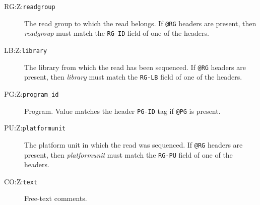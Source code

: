 \documentclass[10pt]{article}
\newcommand{\tagvalue}[1]{{\tt #1}}
\begin{document}
\begin{description}
\item[RG:Z:\tagvalue{readgroup}]
The read group to which the read belongs.
If {\tt @RG} headers are present, then \emph{readgroup} must match the
{\tt RG-ID} field of one of the headers.

\item[LB:Z:\tagvalue{library}]
The library from which the read has been sequenced.
If {\tt @RG} headers are present, then \emph{library} must match the
{\tt RG-LB} field of one of the headers.

\item[PG:Z:\tagvalue{program\_id}]
Program. Value matches the header {\tt PG-ID} tag if {\tt @PG} is present.

\item[PU:Z:\tagvalue{platformunit}]
The platform unit in which the read was sequenced.
If {\tt @RG} headers are present, then \emph{platformunit} must match the
{\tt RG-PU} field of one of the headers.

\item[CO:Z:\tagvalue{text}]
Free-text comments.
\end{description}
\end{document}
